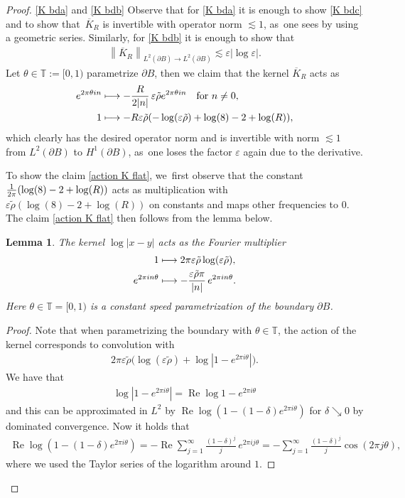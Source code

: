 \documentclass[JEP,XML,SOM,Unicode,published]{cedram}
\newcommand\mto{\mathchoice{\longmapsto}{\mapsto}{\mapsto}{\mapsto}}
\let\epsilon\varepsilon
\newtheorem{lemma}[theorem]{Lemma}
\theoremstyle{definition}
\renewcommand{\Re}{\operatorname{Re}}
\newcommand\T{\mathbb{T}}
\newcommand\norm[1]{\left\lVert #1\right\rVert}
\newcommand\eq{=}
\let\de\partial
\let\eps\epsilon
\begin{document}
\skpt
\begin{proof}
\eqref{K bda} and \eqref{K bdb} Observe that for \eqref{K bda} it is enough to show \eqref{K bdc} and to show that~$\overline{K}_R$ is invertible with operator norm $\lesssim 1$, as~one sees \eg by using a geometric series. Similarly, for \eqref{K bdb} it is enough to show that
\begin{align}
\norm{\overline{K}_R}_{L^2(\de B)\to L^2(\de B)}\lesssim \eps|{\log\eps}|.
\end{align}
Let $\theta\in\T:= [0,1)$ parametrize $\de B$, then we claim that the kernel $\overline{K}_R$ acts as
\begin{equation}\begin{aligned}\label{action K flat}
e^{2\pi\theta in}&\mto -\frac{R}{2|n|}\,\eps\tilde{\rho} e^{2\pi\theta in} \quad\text{for $n\neq 0$},\\
1&\mto -R\eps\tilde{\rho}(-\log(\eps\tilde{\rho})+\log(8)-2+\log(R)),
\end{aligned}\end{equation}
which clearly has the desired operator norm and is invertible with norm $\lesssim 1$ from $L^2(\de B)$ to $H^1(\de B)$, as~one loses the factor $\eps$ again due to the derivative.

To show the claim \eqref{action K flat}, we~first observe that the constant $\frac{1}{2\pi}(\log(8)-2+\nobreak\log(R))$ acts as multiplication with $\eps\tilde{\rho}(\log(8)-2+\log(R))$ on constants and maps other frequencies to $0$. The claim \eqref{action K flat} then follows from the lemma below.

\begin{lemma}\label{action log}
The kernel $\log|x-y|$ acts as the Fourier multiplier
\begin{align*}
1&\mto 2\pi\eps\tilde{\rho}\log(\eps\tilde{\rho}),\\
e^{2\pi in\theta}&\mto -\frac{\eps\tilde{\rho}\pi}{|n|}\,e^{2\pi in\theta}.
\end{align*}
Here $\theta\in \T=[0,1)$ is a constant speed parametrization of the boundary $\de B$.
\end{lemma}
\begin{proof}
Note that when parametrizing the boundary with $\theta\in\T$, the action of the kernel corresponds to convolution with
\begin{align*}
2\pi\eps\tilde{\rho}\bigl(\log(\eps\tilde{\rho})+\log|1-e^{2\pi i\theta}|\bigr).
\end{align*}
We have that
\begin{align*}
\log|1-e^{2\pi i\theta}|\eq \Re \log1-e^{2\pi i\theta}
\end{align*}
and this can be approximated in $L^2$ by $\Re\log(1-(1-\delta)e^{2\pi i\theta})$ for $\delta\searrow 0$ by \eg dominated convergence. Now it holds that
\begin{align*}
\Re\log(1-(1-\delta)e^{2\pi i\theta})\eq -\Re\sum_{j=1}^\infty\frac{(1-\delta)^j}{j}\,e^{2\pi ij\theta}\eq-\sum_{j=1}^\infty\frac{(1-\delta)^j}{j}\cos(2\pi j\theta),
\end{align*}
where we used the Taylor series of the logarithm around $1$.


\end{proof}
\end{proof}
\end{document}
